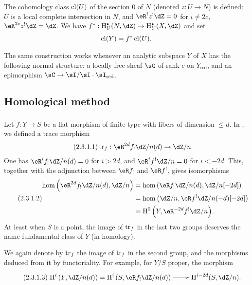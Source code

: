 The cohomology class $\operatorname{cl}(U)$ of the section $0$ of $N$ (denoted
$z:U\to N$) is defined: $U$ is a local complete intersection in $N$, and
$\eR^i z^!\dZ = 0$ for $i\ne 2 c$, $\eR^{2 c} z^!\dZ = \dZ$. We have
$f^*:\h_U^\bullet(N,\dZ) \to \h_Y^\bullet(X,\dZ)$ and set
\[
  \operatorname{cl}(Y) = f^*\operatorname{cl}(U) \text{.}
\]

The same construction works whenever an analytic subspace $Y$ of $X$ has
the following normal structure: a locally free sheaf $\sC$ of rank $c$ on
$Y_\text{red}$, and an epimorphism
$\sC\to \sI/\sI\cdot \sI_\text{red}$.










\subsection{Homological method}\label{IV:2-3}






\subsubsection{}\label{IV:2-3-1}

Let $f:Y\to S$ be a flat morphism of finite type with fibers of dimension
$\leqslant d$. In \cite[XVIII 2.9]{sga4}, we defined a trace morphism
\begin{equation*}\tag{2.3.1.1}\label{IV:eq:2-3-1-1}
  \tr_f:\eR^{2 d} f_! \dZ/n(d) \to \dZ/n \text{.}
\end{equation*}
One has $\eR^i f_!\dZ/n(d)=0$ for $i>2 d$, and
$\eR^i f^!\dZ/n=0$ for $i<-2 d$. This, together with the adjunction between
$\eR f_!$ and $\eR f^!$, gives isomorphisms
\begin{equation*}\tag{2.3.1.2}\label{IV:eq:2-3-1-2}
\begin{aligned}
  \hom\left(\eR^{2 d}f_!\dZ/n(d),\dZ/n\right)
    &= \hom\left(\eR f_!\dZ/n(d),\dZ/n[-2 d]\right) \\
    &= \hom\left(\dZ/n,\eR f^!\dZ/n(-d)[-2 d]\right) \\
    &= \h^0\left(Y,\eR^{-2 d}f^!\dZ/n\right) \text{.}
\end{aligned}
\end{equation*}
At least when $S$ is a point, the image of $\operatorname{tr}_f$ in the last two groups
deserves the name fundamental class of $Y$ (in homology).

We again denote by $\operatorname{tr}_f$ the image of $\operatorname{tr}_f$ in the second group, and the
morphisms deduced from it by functoriality. For example, for $Y/S$ proper,
the morphism
\begin{equation*}\tag{2.3.1.3}\label{IV:eq:2-3-1-3}
\xymatrix{
  \h^i\left(Y,\dZ/n(d)\right) = \h^i\left(S,\eR f_!\dZ/n(d)\right) \ar[r]
    & \h^{i-2 d}(S,\dZ/n) \text{.}
}
\end{equation*}

